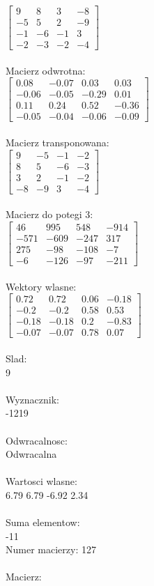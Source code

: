 \documentclass[a4paper,12pt]{article}
\begin{document}
$\begin{bmatrix} 9&8&3&-8\\-5&5&2&-9\\-1&-6&-1&3\\-2&-3&-2&-4 \end{bmatrix}$
\\
\\
Macierz odwrotna:\\

$\begin{bmatrix} 0.08&-0.07&0.03&0.03\\-0.06&-0.05&-0.29&0.01\\0.11&0.24&0.52&-0.36\\-0.05&-0.04&-0.06&-0.09 \end{bmatrix}$
\\
\\
Macierz transponowana:\\

$\begin{bmatrix} 9&-5&-1&-2\\8&5&-6&-3\\3&2&-1&-2\\-8&-9&3&-4 \end{bmatrix}$
\\
\\
Macierz do potegi 3:\\

$\begin{bmatrix} 46&995&548&-914\\-571&-609&-247&317\\275&-98&-108&-7\\-6&-126&-97&-211 \end{bmatrix}$
\\
\\
Wektory wlasne:\\

$\begin{bmatrix} 0.72&0.72&0.06&-0.18\\-0.2&-0.2&0.58&0.53\\-0.18&-0.18&0.2&-0.83\\-0.07&-0.07&0.78&0.07 \end{bmatrix}$
\\
\\
Slad:\\
9
\\
\\
Wyznacznik:\\
-1219
\\
\\
Odwracalnosc:\\
Odwracalna
\\
\\
Wartosci wlasne:\\
6.79 6.79 -6.92 2.34
\\
\\
Suma elementow:\\
-11
\\
\newpage
Numer macierzy:
127
\\
\\
Macierz:\\
\end{document}
